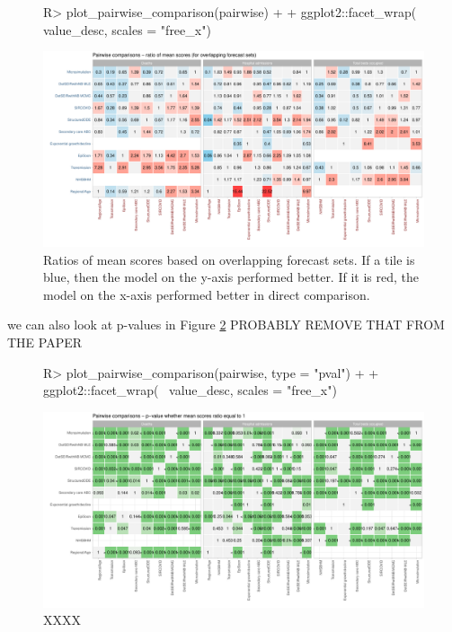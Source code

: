 \documentclass[article]{jss}
\begin{document}
\begin{figure}[h!]
\centering
\begin{Schunk}
\begin{Sinput}
R> plot_pairwise_comparison(pairwise) +
+    ggplot2::facet_wrap(~ value_desc, scales = "free_x") 
\end{Sinput}
\end{Schunk}
\includegraphics{plots/plot-pairwise-plot}
\caption{\label{fig:pairwise-comparison} Ratios of mean scores based on overlapping forecast sets. If a tile is blue, then the model on the y-axis performed better. If it is red, the model on the x-axis performed better in direct comparison. }
\end{figure}

we can also look at p-values in Figure \ref{fig:pairwise-comparison-pval} PROBABLY REMOVE THAT FROM THE PAPER
\begin{figure}[h!]
\centering
\begin{Schunk}
\begin{Sinput}
R> plot_pairwise_comparison(pairwise, type = "pval") +
+    ggplot2::facet_wrap(~ value_desc, scales = "free_x") 
\end{Sinput}
\end{Schunk}
\includegraphics{plots/plot-pairwise-plot-ratio}
\caption{\label{fig:pairwise-comparison-pval} XXXX}
\end{figure}
\end{document}
